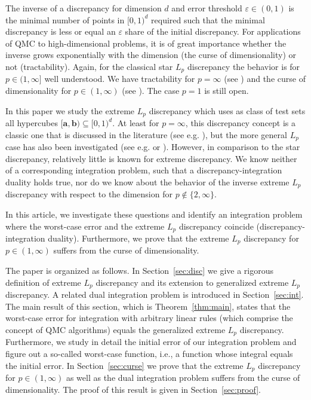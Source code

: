 \documentclass[12pt]{article}
\theoremstyle{remark}
\theoremstyle{definition}
\newcommand{\bsa}{{\boldsymbol a}}
\newcommand{\bsb}{{\boldsymbol b}}
\newcommand{\<}{\langle}
\renewcommand{\>}{\rangle}
\begin{document}
The inverse of a discrepancy for dimension $d$ and error threshold $\varepsilon \in (0,1)$ is the minimal number of points in $[0,1)^d$ required such that the minimal discrepancy is less or equal an $\varepsilon$ share of the initial discrepancy. For applications of QMC to high-dimensional problems, it is of great importance whether the inverse grows exponentially with the dimension (the curse of dimensionality) or not (tractability). Again, for the classical star $L_p$ discrepancy the behavior is for $p \in (1,\infty]$ well understood. We have tractability for $p=\infty$ (see \cite{hnww}) and the curse of dimensionality for $p \in (1,\infty)$ (see \cite{NP25}). The case $p=1$ is still open. 

In this paper we study the extreme $L_p$ discrepancy which uses as class of test sets all hypercubes $[\bsa,\bsb) \subseteq [0,1)^d$. At least for $p=\infty$, this discrepancy concept is a classic one that is discussed in the literature (see e.g. \cite{DT97,KN74}), but the more general $L_p$ case has also been investigated (see e.g. \cite{Gne05,HW12,MC94} or \cite[Sec.~9.5.5]{NW10}). However, in comparison to the star discrepancy, relatively little is known for extreme discrepancy. We know neither of a corresponding integration problem, such that a discrepancy-integration duality holds true, nor do we know about the behavior of the inverse extreme $L_p$ discrepancy with respect to the dimension for $p \not\in \{2,\infty\}$.

In this article, we investigate these questions and identify an integration problem where the worst-case error and the extreme $L_p$ discrepancy coincide (discrepancy-integration duality). Furthermore, we prove that the extreme $L_p$ discrepancy for $p \in (1,\infty)$ suffers from the curse of dimensionality.

The paper is organized as follows. In Section~\ref{sec:disc} we give a rigorous definition of extreme $L_p$ discrepancy and its extension to generalized extreme $L_p$ discrepancy.  A related dual integration problem is introduced in Section~\ref{sec:int}. The main result of this section, which is Theorem~\ref{thm:main}, states that the worst-case error for integration with arbitrary linear rules (which comprise the concept of QMC algorithms) equals the generalized extreme $L_p$ discrepancy. Furthermore, we study in detail the initial error of our integration problem and figure out a so-called worst-case function, i.e., a function whose integral equals the initial error. In Section~\ref{sec:curse} we prove that the extreme $L_p$ discrepancy for $p \in (1,\infty)$ as well as the dual integration problem suffers from the curse of dimensionality. The proof of this result is given in Section~\ref{sec:proof}.
\end{document}
